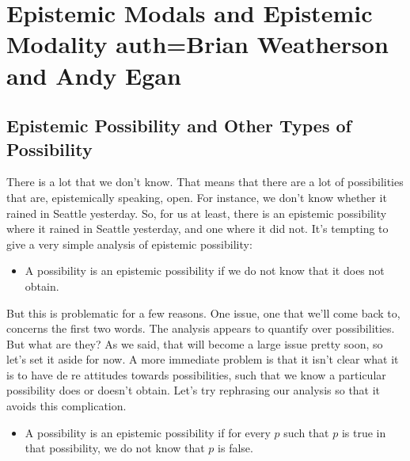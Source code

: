 \chapter[Epistemic Modals and Epistemic Modality]{Epistemic Modals and Epistemic Modality auth=Brian Weatherson and Andy Egan}



\section{Epistemic Possibility and Other Types of Possibility}
There is a lot that we don't know. That means that there are a lot of possibilities that are, epistemically speaking, open. For instance, we don't know whether it rained in Seattle yesterday. So, for us at least, there is an epistemic possibility where it rained in Seattle yesterday, and one where it did not. It's tempting to give a very simple analysis of epistemic possibility:

\begin{itemize}
\item A possibility is an epistemic possibility if we do not know that it does not obtain.
\end{itemize}

\noindent But this is problematic for a few reasons. One issue, one that we'll come back to, concerns the first two words. The analysis appears to quantify over possibilities. But what are they? As we said, that will become a large issue pretty soon, so let's set it aside for now. A more immediate problem is that it isn't clear what it is to have de re attitudes towards possibilities, such that we know a particular possibility does or doesn't obtain. Let's try rephrasing our analysis so that it avoids this complication.

\begin{itemize}
\item A possibility is an epistemic possibility if for every $p$ such that $p$ is true in that possibility, we do not know that $p$ is false.
\end{itemize}

